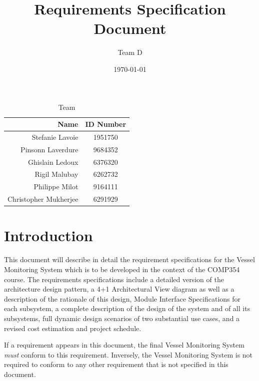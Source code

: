 \documentclass{article}
\begin{document}
\title{Requirements Specification Document}
\author{Team D}
\date{\today}

\maketitle

\vspace*{1.5in}
\begin{table}[htbp]
\caption{Team}
\begin{center}
\begin{tabular}{|r | c|}
\hline
Name & ID Number \\
\hline\hline
Stefanie Lavoie & 1951750 \\
Pinsonn Laverdure & 9684352 \\
Ghislain Ledoux & 6376320 \\
Rigil Malubay & 6262732 \\
Philippe Milot & 9164111 \\
Christopher Mukherjee & 6291929 \\
\hline
\end{tabular}
\end{center}
\end{table}

\clearpage

\tableofcontents
\clearpage


\section{Introduction} %

This document will describe in detail the requirement specifications for the Vessel Monitoring System which is to be developed in the context of the COMP354 course. The requirements specifications include a detailed version of the architecture design pattern, a 4+1 Architectural View diagram as well as a description of the rationale of this design, Module Interface Specifications for each subsystem, a complete description of the design of the system and of all its subsystems, full dynamic design scenarios of two substantial use cases, and a revised cost estimation and project schedule.

If a requirement appears in this document, the final Vessel Monitoring System \emph{must} conform to this requirement. Inversely, the Vessel Monitoring System is not required to conform to any other requirement that is not specified in this document.
\end{document}
